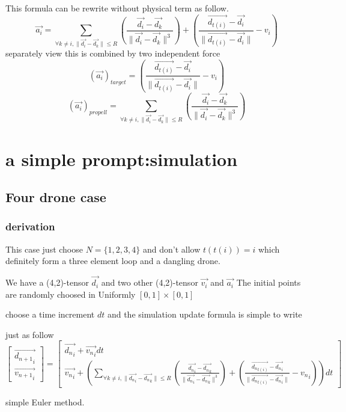 \documentclass{article}
\theoremstyle{definition} %
\begin{document}
This formula can be rewrite without physical term as
follow.
\[
    \vec{a_i}=\sum_{\forall k\neq i,\|\vec{d_i}-\vec{d_k}\|\leq R}(\frac{\vec{d_i}-\vec{d_k}}{\|\vec{d_i}-\vec{d_k}\|^3})+(\frac{\vec{d_{t(i)}}-\vec{d_i}}{\|\vec{d_{t(i)}}-\vec{d_i}\|}-v_i)
\]
separately view this is combined by two independent force
\[
    (\vec{a_i})_{target}=(\frac{\vec{d_{t(i)}}-\vec{d_i}}{\|\vec{d_{t(i)}}-\vec{d_i}\|}-v_i)
\]
\[
    (\vec{a_i})_{propell}=\sum_{\forall k\neq i,\|\vec{d_i}-\vec{d_k}\|\leq R}(\frac{\vec{d_i}-\vec{d_k}}{\|\vec{d_i}-\vec{d_k}\|^3})
\]

\section{a simple prompt:simulation}
\subsection{Four drone case}
\subsubsection{derivation}
This case just choose \(N=\{1,2,3,4\}\)
and don't allow \(t(t(i))=i\)
which definitely form a three element loop and
a dangling drone.

We have a (4,2)-tensor \(\vec{d_i}\)
and two other (4,2)-tensor \(\vec{v_i}\)
and \(\vec{a_i}\)
The initial points are randomly choosed
in Uniformly \([0,1]\times[0,1]\)

choose a time increment \(dt\)
and the simulation update formula is simple to write

just as follow
\[\begin{bmatrix}
        \vec{{d_{n+1}}_i} \\
        \vec{{v_{n+1}}_i}
    \end{bmatrix}=
    \begin{bmatrix}
        \vec{{d_{n}}_i}+\vec{{v_n}_i}dt \\
        \vec{{v_{n}}_i}+(\sum_{\forall k\neq i,\|\vec{{d_n}_i}-\vec{{d_n}_k}\|\leq R}(\frac{\vec{{d_n}_i}-\vec{{d_n}_k}}{\|\vec{{d_n}_i}-\vec{{d_n}_k}\|^3})+(\frac{\vec{{d_n}_{t(i)}}-\vec{{d_n}_i}}{\|\vec{{d_n}_{t(i)}}-\vec{{d_n}_i}\|}-{v_n}_i))dt
    \end{bmatrix}
\]

simple Euler method.
\end{document}
